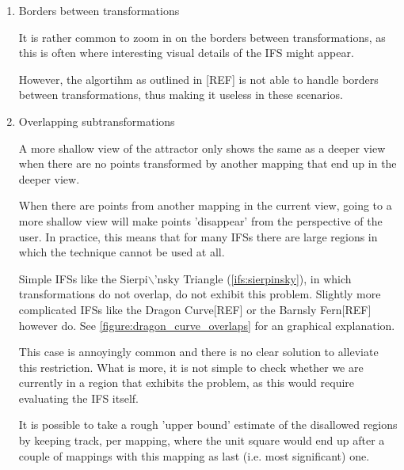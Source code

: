 \documentclass[11pt]{article}
\begin{document}
\begin{enumerate}
\item Borders between transformations
\label{sec:org5801534}

It is rather common to zoom in on the borders between transformations, as this is often
where interesting visual details of the IFS might appear.


However, the algortihm as outlined in [REF] is not able to handle borders between transformations,
thus making it useless in these scenarios.

\item Overlapping subtransformations
\label{sec:org1eef9d6}

A more shallow view of the attractor only shows the same as a deeper view when
there are no points transformed by another mapping that end up in the deeper view.

When there are points from another mapping in the current view, 
going to a more shallow view will make points 'disappear' from the perspective of the user.
In practice, this means that for many IFSs there are large regions in which the technique cannot be used at all.

Simple IFSs like the Sierpi$\backslash$'nsky Triangle (\autoref{ifs:sierpinsky}), in which transformations
do not overlap, do not exhibit this problem. 
Slightly more complicated IFSs like the Dragon Curve[REF] or the Barnsly Fern[REF] however do.
See \autoref{figure:dragon_curve_overlaps} for an graphical explanation.

This case is annoyingly common and there is no clear solution to alleviate this restriction.
What is more, it is not simple to check whether we are currently in a region that exhibits the problem,
as this would require evaluating the IFS itself.

It is possible to take a rough 'upper bound' estimate of the disallowed regions by keeping track, 
per mapping, where the unit square would end up after a couple of mappings with this mapping as last (i.e. most significant) one.



\end{enumerate}
\end{document}
